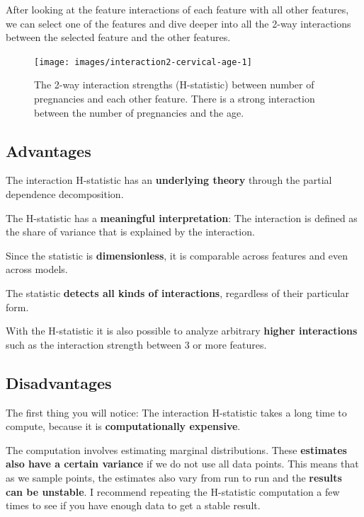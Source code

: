 \documentclass[
  12pt,
]{krantz}
\begin{document}
After looking at the feature interactions of each feature with all other features, we can select one of the features and dive deeper into all the 2-way interactions between the selected feature and the other features.

\begin{figure}

{\centering \texttt{[image: images/interaction2-cervical-age-1]} 

}

\caption{The 2-way interaction strengths (H-statistic) between number of pregnancies and each other feature. There is a strong interaction between the number of pregnancies and the age.}\label{fig:interaction2-cervical-age-include}
\end{figure}

\hypertarget{advantages-7}{%
\subsection{Advantages}\label{advantages-7}}

The interaction H-statistic has an \textbf{underlying theory} through the partial dependence decomposition.

The H-statistic has a \textbf{meaningful interpretation}:
The interaction is defined as the share of variance that is explained by the interaction.

Since the statistic is \textbf{dimensionless}, it is comparable across features and even across models.

The statistic \textbf{detects all kinds of interactions}, regardless of their particular form.

With the H-statistic it is also possible to analyze arbitrary \textbf{higher interactions} such as the interaction strength between 3 or more features.

\hypertarget{disadvantages-7}{%
\subsection{Disadvantages}\label{disadvantages-7}}

The first thing you will notice:
The interaction H-statistic takes a long time to compute, because it is \textbf{computationally expensive}.

The computation involves estimating marginal distributions.
These \textbf{estimates also have a certain variance} if we do not use all data points.
This means that as we sample points, the estimates also vary from run to run and the \textbf{results can be unstable}.
I recommend repeating the H-statistic computation a few times to see if you have enough data to get a stable result.
\end{document}
